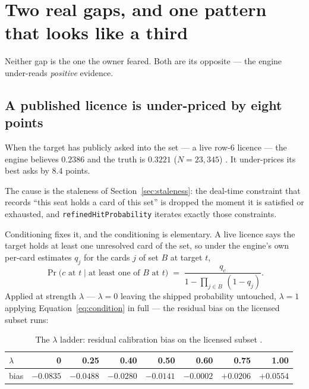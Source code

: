 \documentclass[11pt]{article}
\newcommand{\code}[1]{\texttt{#1}}
\begin{document}
\section{Two real gaps, and one pattern that looks like a third}
\label{sec:gaps}

Neither gap is the one the owner feared. Both are its opposite --- the engine under-reads
\emph{positive} evidence.

\subsection{A published licence is under-priced by eight points}
\label{sec:underpricing}

When the target has publicly asked into the set --- a live row-6 licence --- the engine
believes $0.2386$ and the truth is $0.3221$ ($N = 23{,}345$) \cite{asking}. It under-prices
its best asks by $8.4$ points.

The cause is the staleness of Section~\ref{sec:staleness}: the deal-time constraint that
records ``this seat holds a card of this set'' is dropped the moment it is satisfied or
exhausted, and \code{refinedHitProbability} iterates exactly those constraints.

Conditioning fixes it, and the conditioning is elementary. A live licence says the target
holds at least one unresolved card of the set, so under the engine's own per-card
estimates $q_j$ for the cards $j$ of set $B$ at target $t$,
\begin{equation}
\label{eq:condition}
\Pr\bigl(c \text{ at } t \;\big|\; \text{at least one of } B \text{ at } t\bigr)
\;=\;
\frac{q_c}{1 - \prod_{j \in B}\,(1 - q_j)} .
\end{equation}
Applied at strength $\lambda$ --- $\lambda = 0$ leaving the shipped probability untouched,
$\lambda = 1$ applying Equation~\eqref{eq:condition} in full --- the residual bias on the
licensed subset runs:

\begin{table}[ht]
\centering
\caption{The $\lambda$ ladder: residual calibration bias on the licensed subset
\cite{asking}.}
\label{tab:lambda}
\small
\begin{tabular}{@{}lrrrrrrr@{}}
\toprule
$\lambda$ & 0 & 0.25 & 0.40 & 0.50 & \textbf{0.60} & 0.75 & 1.00 \\
\midrule
bias & $-0.0835$ & $-0.0488$ & $-0.0280$ & $-0.0141$ & $\mathbf{-0.0002}$ & $+0.0206$
 & $+0.0554$ \\
\bottomrule
\end{tabular}
\end{table}
\end{document}
